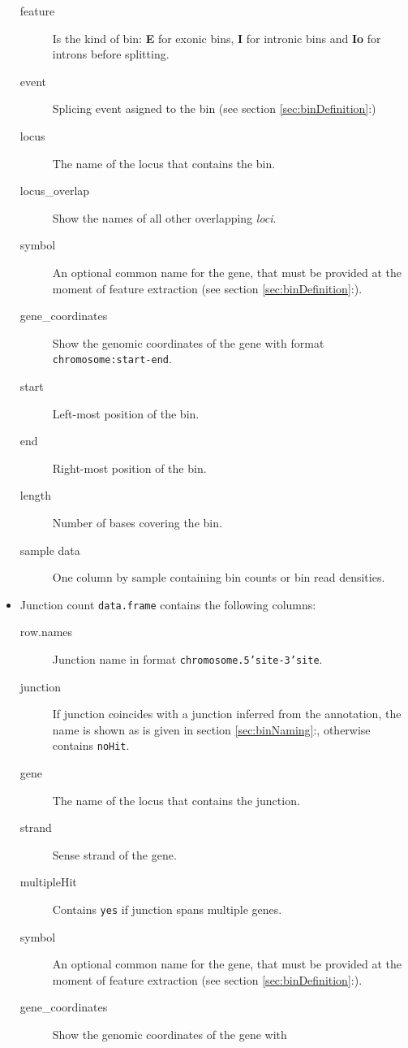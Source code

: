 \documentclass{article}
\begin{document}
\begin{itemize}
\begin{description}
      \item[feature] Is the kind of bin: \textbf{E} for exonic bins, \textbf{I}
      for intronic bins and \textbf{Io} for introns before splitting.
      \item[event] Splicing event asigned to the bin (see section
      \ref{sec:binDefinition}:)
      \item[locus] The name of the locus that contains the bin.
      \item[locus\_overlap] Show the names of all other overlapping \textit{loci}.
      \item[symbol] An optional common name for the gene, that must be provided at
      the moment of feature extraction (see section \ref{sec:binDefinition}:).
      \item[gene\_coordinates] Show the genomic coordinates of the gene with
      format \texttt{chromosome:start-end}.
      \item[start] Left-most position of the bin.
      \item[end] Right-most position of the bin.
      \item[length] Number of bases covering the bin.
      \item[sample data] One column by sample containing bin counts or bin read
      densities.
      \\
    \end{description}
  \item Junction count \texttt{data.frame} contains the following columns:
    \begin{description}
      \item[row.names] Junction name in format \texttt{chromosome.5'site-3'site}.
      \item[junction] If junction coincides with a junction inferred
      from the annotation, the name is shown as is given in section
      \ref{sec:binNaming}:, otherwise contains \texttt{noHit}.
      \item[gene] The name of the locus that contains the junction.
      \item[strand] Sense strand of the gene.
      \item[multipleHit] Contains \texttt{yes} if junction spans multiple genes.
      \item[symbol] An optional common name for the gene, that must be provided at
      the moment of feature extraction (see section \ref{sec:binDefinition}:).
      \item[gene\_coordinates] Show the genomic coordinates of the gene with

\end{description}
\end{itemize}
\end{document}
